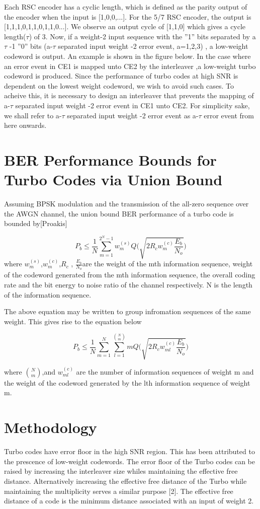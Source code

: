 \documentclass[20 pts]{article}
\begin{document}
Each RSC encoder has a cyclic length, which is defined as the parity output of the
 encoder when the input is [1,0,0,...]. For the 5/7 RSC encoder, the output is
 [1,1,1,0,1,1,0,1,1,0...]. We observe an output cycle of [1,1,0] which gives a cycle 
 length($\tau$) of 3. Now, if a weight-2 input sequence with the ''1'' bits separated 
 by a$\tau$ -1 ''0'' bits (a-$\tau$ separated input weight -2 error event, a={1,2,3}) ,
 a low-weight codeword is output. An example is shown in the figure below. In the
 case where an error event in CE1 is mapped unto CE2 by the interleaver ,a 
 low-weight turbo codeword is produced. Since the performance of turbo codes at
 high SNR is dependent on the lowest weight codeword, we wish to avoid such
 cases. To acheive this, it is necessary to design an interleaver that prevents the 
 mapping of a-$\tau$ separated input weight -2 error event in CE1 unto CE2. For
 simplicity sake, we shall refer to a-$\tau$ separated input weight -2 error event as
 a-$\tau$ error event from here onwards.
 
\section{ BER Performance Bounds for Turbo Codes via Union Bound}
Assuming BPSK modulation and the transmission of the all-zero sequence
over the AWGN channel, the union bound BER performance of a turbo code is 
 bounded by[Proakis]
 
 $$P_b \leq \frac{1}{N} \sum_{m=1}^{2^N-1} w^{(s)}_{m} Q\Bigg(\sqrt{2R_cw^{(c)}_{m}\frac{E_b}{N_o}}\Bigg)$$
where $w^{(s)}_m$,$w^{(c)}_m$,$R_c$ , $\frac{E_b}{N_o}$are the weight of the mth information
 sequence, weight of the codeword generated from the mth information sequence, the overall 
 coding rate and the bit energy to noise ratio of the channel respectively. N is the length of the 
 information sequence.
 
 The above equation may be written to group infromation sequences of the same 
 weight. This gives rise to the equation below
 
 \begin{equation}
P_b \leq \frac{1}{N} \sum_{m=1}^{N} \sum_{l=1}^{\binom{N}{m}}mQ\Bigg(\sqrt{2R_cw^{(c)}_{ml}\frac{E_b}{N_o}}\Bigg)
 \end{equation}
 
where $\binom{N}{m}$,and $w^{(c)}_{ml}$ are the number of information 
sequences of weight m and the weight of the codeword generated by the lth information
sequence of weight m.
\section{Methodology}
Turbo codes have error floor in the high SNR region. This has been attributed to the 
prescence of low-weight codewords. The error floor of the Turbo codes can be raised
 by increasing the interleaver size whiles maintaining the effective free distance. 
 Alternatively increasing the effective free distance of the Turbo while maintaining the 
 multiplicity serves a similar purpose [2]. The effective free distance of a code is the
  minimum distance associated with an input of weight 2. 
\end{document}
